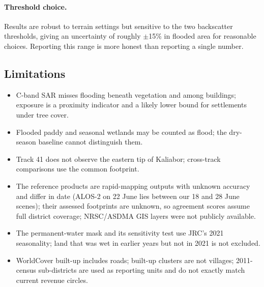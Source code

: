 \documentclass[11pt,a4paper]{article}
\begin{document}
\paragraph{Threshold choice.} Results are robust to terrain settings but sensitive to the two backscatter thresholds,
giving an uncertainty of roughly $\pm$15\% in flooded area for reasonable choices. Reporting this range is more honest
than reporting a single number.

\subsection*{Limitations}
\begin{itemize}
\item C-band SAR misses flooding beneath vegetation and among buildings; exposure is a proximity indicator and a likely lower bound for settlements under tree cover.
\item Flooded paddy and seasonal wetlands may be counted as flood; the dry-season baseline cannot distinguish them.
\item Track 41 does not observe the eastern tip of Kaliabor; cross-track comparisons use the common footprint.
\item The reference products are rapid-mapping outputs with unknown accuracy and differ in date (ALOS-2 on 22 June lies between our 18 and 28 June scenes); their assessed footprints are unknown, so agreement scores assume full district coverage; NRSC/ASDMA GIS layers were not publicly available.
\item The permanent-water mask and its sensitivity test use JRC's 2021 seasonality; land that was wet in earlier years but not in 2021 is not excluded.
\item WorldCover built-up includes roads; built-up clusters are not villages; 2011-census sub-districts are used as reporting units and do not exactly match current revenue circles.
\end{itemize}

\end{document}

